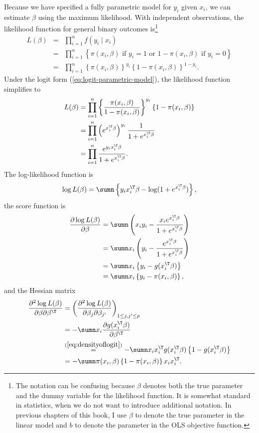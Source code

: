 Because we have specified a fully parametric model for $y_{i}$ given
$x_{i}$, we can estimate $\beta$ using the maximum likelihood. With
independent observations,   the likelihood function for
general binary outcomes is\footnote{The notation can be confusing because $\beta$ denotes both the true parameter and the dummy variable for the likelihood function.
It is somewhat standard in statistics, when we do not want to introduce additional notation. In previous chapters of this book, I use $\beta$ to denote the true parameter in the linear model and $b$ to denote the parameter in the OLS objective function. 
}
\begin{eqnarray*}
L(\beta) &=& 
\prod_{i=1}^{n} f(y_i\mid x_i) \\
&=& 
\prod_{i=1}^{n}   \left\{  \pi(x_{i},\beta) \text{ if } y_i = 1 \text{ or } 1-\pi(x_{i},\beta) \text{ if } y_i = 0  \right\} \\
&=&
\prod_{i=1}^{n}\left\{ \pi(x_{i},\beta)\right\} ^{y_{i}}\left\{ 1-\pi(x_{i},\beta)\right\} ^{1-y_{i}}.
\end{eqnarray*}
Under the logit form (\ref{eq:logit-parametric-model}), the likelihood function simplifies to
\begin{align*}
L(\beta) & =\prod_{i=1}^{n}\left\{ \frac{\pi(x_{i},\beta)}{1-\pi(x_{i},\beta)}\right\} ^{y_{i}}\left\{ 1-\pi(x_{i},\beta)\right\} \\
 & =\prod_{i=1}^{n}\left(e^{x_{i}^{\T}\beta}\right)^{y_{i}}\frac{1}{1+e^{x_{i}^{\T}\beta}}\\
 & =\prod_{i=1}^{n}\frac{e^{y_{i}x_{i}^{\T}\beta}}{1+e^{x_{i}^{\T}\beta}}.
\end{align*}
The log-likelihood function is
\[
\log L(\beta)=\sumn\left\{ y_{i}x_{i}^{\T}\beta-\log(1+e^{x_{i}^{\T}\beta})\right\} ,
\]
the score function is
\begin{align*}
\frac{\partial\log L(\beta)}{\partial\beta} & =\sumn\left(x_{i}y_{i}-\frac{x_{i}e^{x_{i}^{\T}\beta}}{1+e^{x_{i}^{\T}\beta}}\right)\\
 & =\sumn x_{i}\left(y_{i}-\frac{e^{x_{i}^{\T}\beta}}{1+e^{x_{i}^{\T}\beta}}\right)\\
 &= \sumn x_{i}\left\{  y_{i}-  g(x_{i}^{\T} \beta)  \right\} \\
 & =\sumn x_{i}\left\{ y_{i}-\pi(x_{i},\beta)\right\} ,
\end{align*}
and the Hessian matrix
\begin{align*}
\frac{\partial^{2}\log L(\beta)}{\partial\beta\partial\beta^{\T}} & =\left(\frac{\partial^{2}\log L(\beta)}{\partial\beta_{j}\partial\beta_{j'}}\right)_{1\leq j,j'\leq p}\\
 & =-\sumn x_{i}\frac{\partial g(x_{i}^{\T}\beta)}{\partial\beta^{\T}}\\
 & \stackrel{(\ref{eq:densityoflogit})}{=}-\sumn x_{i}x_{i}^{\T}g(x_{i}^{\T}\beta)\left\{ 1-g(x_{i}^{\T}\beta)\right\} \\
 & =-\sumn\pi(x_{i},\beta)\left\{ 1-\pi(x_{i},\beta)\right\} x_{i}x_{i}^{\T}.
\end{align*}
